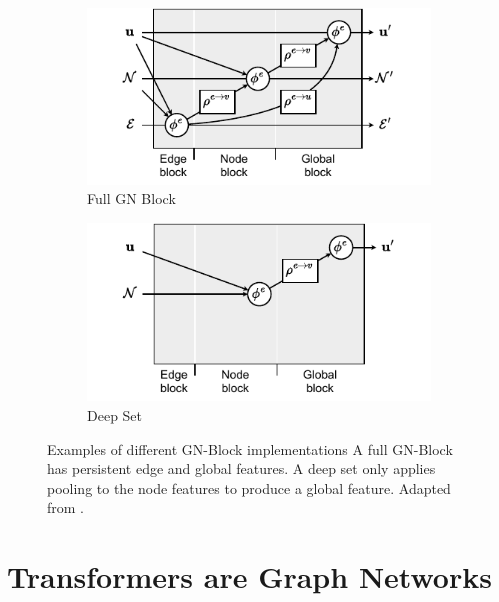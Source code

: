 \begin{figure}
    \centering
    \begin{subfigure}[b]{0.49\textwidth}
        \centering
        \includegraphics[width=\textwidth]{Figures/transformers/full_gn.pdf}
        \caption{Full GN Block}
        \label{fig:full_gn_block}
    \end{subfigure}
    \begin{subfigure}[b]{0.49\textwidth}
        \centering
        \includegraphics[width=\textwidth]{Figures/transformers/deepset.pdf}
        \caption{Deep Set}
        \label{fig:deep_set}
    \end{subfigure}
    \caption{Examples of different GN-Block implementations  A full GN-Block has persistent edge and global features.  A deep set only applies pooling to the node features to produce a global feature. Adapted from \textcite{RelationalInductiveBiases}.}
\end{figure}

\section{Transformers are Graph Networks}
\label{sec:transformers}

